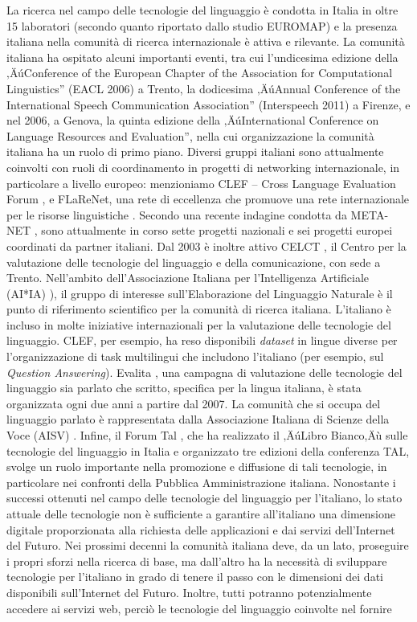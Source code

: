 \begin{multicols}{2}
La ricerca nel campo delle tecnologie del linguaggio \`{e} condotta in Italia in oltre 15 laboratori (secondo quanto riportato dallo studio EUROMAP) e la presenza italiana nella comunit\`{a} di ricerca internazionale \`{e} attiva e rilevante. La comunit\`{a} italiana ha ospitato alcuni importanti eventi, tra cui l'undicesima edizione della ‚ÄúConference of the European Chapter of the Association for Computational Linguistics'' (EACL 2006) a Trento, la dodicesima ‚ÄúAnnual Conference of the International Speech Communication Association'' (Interspeech 2011) a Firenze, e nel 2006, a Genova, la quinta edizione della ‚ÄúInternational Conference on Language Resources and Evaluation'', nella cui organizzazione la comunit\`{a} italiana ha un ruolo di primo piano. Diversi gruppi italiani sono attualmente coinvolti con ruoli di coordinamento in progetti di networking internazionale, in particolare a livello europeo: menzioniamo CLEF -- Cross Language Evaluation Forum \cite{clef}, e FLaReNet, una rete di eccellenza che promuove una rete internazionale per le risorse linguistiche \cite{flarenet}. Secondo una recente indagine condotta da META-NET \cite{soria}, sono attualmente in corso sette progetti nazionali e sei progetti europei coordinati da partner italiani. Dal 2003 \`{e} inoltre attivo CELCT \cite{celct}, il Centro per la valutazione delle tecnologie del linguaggio e della comunicazione, con sede a Trento. Nell'ambito dell'Associazione Italiana per l'Intelligenza Artificiale (AI*IA) \cite{aixia}), il gruppo di interesse sull'Elaborazione del Linguaggio Naturale \`{e} il punto di riferimento scientifico per la comunit\`{a} di ricerca italiana. L'italiano \`{e} incluso in molte iniziative internazionali per la valutazione delle tecnologie del linguaggio. CLEF, per esempio, ha reso disponibili \emph{dataset} in lingue diverse per l'organizzazione di task multilingui che includono l'italiano (per esempio, sul \emph{Question Answering}). Evalita \cite{evalita}, una campagna di valutazione delle tecnologie del linguaggio sia parlato che scritto, specifica per la lingua italiana, \`{e} stata organizzata ogni due anni a partire dal 2007. La comunit\`{a} che si occupa del linguaggio parlato \`{e} rappresentata dalla Associazione Italiana di Scienze della Voce (AISV) \cite{aisv}. Infine, il Forum Tal \cite{forumtal}, che ha realizzato il ‚ÄúLibro Bianco‚Äù sulle tecnologie del linguaggio in Italia e organizzato tre edizioni della conferenza TAL, svolge un ruolo importante nella promozione e diffusione di tali tecnologie, in particolare nei confronti della Pubblica Amministrazione italiana. Nonostante i successi ottenuti nel campo delle tecnologie del linguaggio per l'italiano, lo stato attuale delle tecnologie non \`{e} sufficiente a garantire all'italiano una dimensione digitale  proporzionata alla richiesta delle applicazioni e dai servizi dell'Internet del Futuro. Nei prossimi decenni la comunit\`{a} italiana deve, da un lato, proseguire i propri sforzi nella ricerca di base, ma dall'altro ha la necessit\`{a} di sviluppare tecnologie per l'italiano in grado di tenere il passo con le dimensioni dei dati disponibili sull'Internet del Futuro. Inoltre, tutti potranno potenzialmente accedere ai servizi web, perci\`{o} le tecnologie del linguaggio coinvolte nel fornire 
\end{multicols}

